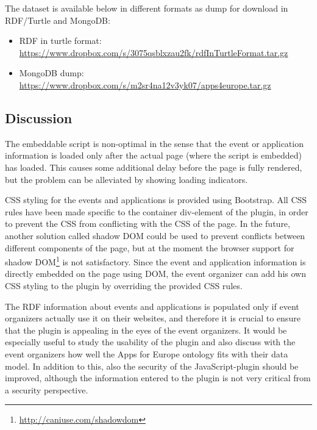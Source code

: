 The dataset is available below in different formats as dump for download in RDF/Turtle and MongoDB:

\begin{itemize}
\item RDF in turtle format: \url{https://www.dropbox.com/s/3075qsblxzau2fk/rdfInTurtleFormat.tar.gz} 
\item MongoDB dump: \url{https://www.dropbox.com/s/m2sr4na12v3yk07/apps4europe.tar.gz} 
\end{itemize}

\subsection{Discussion}
The embeddable script is non-optimal in the sense that the event or application information is loaded only after the actual page (where the script is embedded) has loaded. This causes some additional delay before the page is fully rendered, but the problem can be alleviated by showing loading indicators.

CSS styling for the events and applications is provided using Bootstrap. All CSS rules have been made specific to the container div-element of the plugin, in order to prevent the CSS from conflicting with the CSS of the page. In the future, another solution called shadow DOM could be used to prevent conflicts between different components of the page, but at the moment the browser support for shadow DOM\footnote{\url{http://caniuse.com/shadowdom}} is not satisfactory. Since the event and application information is directly embedded on the page using DOM, the event organizer can add his own CSS styling to the plugin by overriding the provided CSS rules.

The RDF information about events and applications is populated only if event organizers actually use it on their websites, and therefore it is crucial to ensure that the plugin is appealing in the eyes of the event organizers. It would be especially useful to study the usability of the plugin and also discuss with the event organizers how well the Apps for Europe ontology fits with their data model. In addition to this, also the security of the JavaScript-plugin should be improved, although the information entered to the plugin is not very critical from a security perspective.



